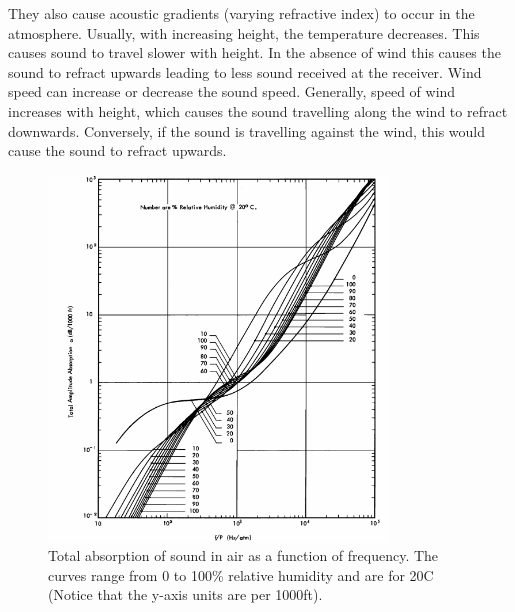 They also cause acoustic gradients (varying refractive index) to occur in the atmosphere. Usually, with increasing height, the temperature decreases. This causes sound to travel slower with height. In the absence of wind this causes the sound to refract upwards leading to less sound received at the receiver. Wind speed can increase or decrease the sound speed. Generally, speed of wind increases with height, which causes the sound travelling along the wind to refract downwards. Conversely, if the sound is travelling against the wind, this would cause the sound to refract upwards.
\begin{figure}[h]
\includegraphics[width=0.8\textwidth]{Figures/airAbsorption.png}
\caption{Total absorption of sound in air as a function of frequency. The curves range from 0 to 100\% relative humidity and are for 20\degree C \cite{evans1972atmospheric} (Notice that the y-axis units are per 1000ft).}
\label{Fig:airAbsorption}
\end{figure}

